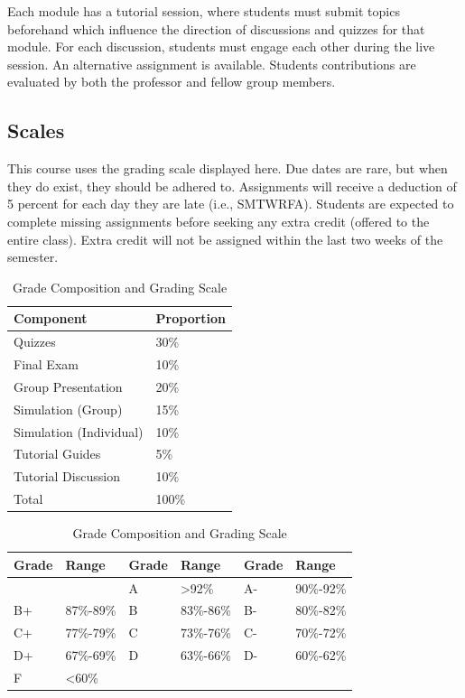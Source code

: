 \documentclass[10pt,]{article}
\begin{document}
Each module has a tutorial session, where students must submit topics
beforehand which influence the direction of discussions and quizzes for
that module. For each discussion, students must engage each other during
the live session. An alternative assignment is available. Students
contributions are evaluated by both the professor and fellow group
members.

\hypertarget{scales}{%
\subsection{Scales}\label{scales}}

This course uses the grading scale displayed here. Due dates are rare,
but when they do exist, they should be adhered to. Assignments will
receive a deduction of 5 percent for each day they are late (i.e.,
SMTWRFA). Students are expected to complete missing assignments before
seeking any extra credit (offered to the entire class). Extra credit
will not be assigned within the last two weeks of the semester.

\begin{table}[!h]
\caption{\label{tab:unnamed-chunk-2}Grade Composition and Grading Scale}

\centering
\begin{tabular}[t]{ll}
\toprule
Component & Proportion\\
\midrule
Quizzes & 30\%\\
Final Exam & 10\%\\
Group Presentation & 20\%\\
Simulation (Group) & 15\%\\
Simulation (Individual) & 10\%\\
\addlinespace
Tutorial Guides & 5\%\\
Tutorial Discussion & 10\%\\
Total & 100\%\\
\bottomrule
\end{tabular}
\centering
\begin{tabular}[t]{llllll}
\toprule
Grade & Range & Grade & Range & Grade & Range\\
\midrule
 &  & A & >92\% & A- & 90\%-92\%\\
B+ & 87\%-89\% & B & 83\%-86\% & B- & 80\%-82\%\\
C+ & 77\%-79\% & C & 73\%-76\% & C- & 70\%-72\%\\
D+ & 67\%-69\% & D & 63\%-66\% & D- & 60\%-62\%\\
F & <60\% &  &  &  & \\
\bottomrule
\end{tabular}
\end{table}
\end{document}
